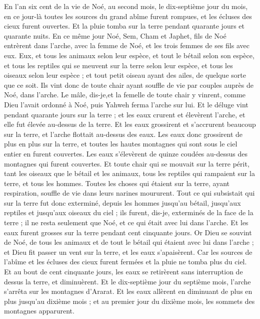 \begin{multicols}{2}
En l'an six cent de la vie de Noé, au second mois, le dix-septième jour du mois, en ce jour-là toutes les sources du grand abîme furent rompues, et les écluses des cieux furent ouvertes.
Et la pluie tomba sur la terre pendant quarante jours et quarante nuits.
En ce même jour Noé, Sem, Cham et Japhet, fils de Noé entrèrent dans l'arche, avec la femme de Noé, et les trois femmes de ses fils avec eux.
Eux, et tous les animaux selon leur espèce, et tout le bétail selon son espèce, et tous les reptiles qui se meuvent sur la terre selon leur espèce, et tous les oiseaux selon leur espèce ; et tout petit oiseau ayant des ailes, de quelque sorte que ce soit.
Ils vint donc de toute chair ayant souffle de vie par couples auprès de Noé, dans l'arche. 
Le mâle, dis-je,et la femelle de toute chair y vinrent, comme Dieu l'avait ordonné à Noé, puis Yahweh ferma l'arche sur lui.
Et le déluge vint pendant quarante jours sur la terre ; et les eaux crurent et élevèrent l'arche, et elle fut élevée au-dessus de la terre.
Et les eaux grossirent et s'accrurent beaucoup sur la terre, et l'arche flottait au-dessus des eaux.
Les eaux donc grossirent de plus en plus sur la terre, et toutes les hautes montagnes qui sont sous le ciel entier en furent couvertes.
Les eaux s'élevèrent de quinze coudées au-dessus des montagnes qui furent couvertes.
Et toute chair qui se mouvait sur la terre périt, tant les oiseaux que le bétail et les animaux, tous les reptiles qui rampaient sur la terre, et tous les hommes.
Toutes les choses qui étaient sur la terre, ayant respiration, souffle de vie dans leurs narines moururent.
Tout ce qui subsistait qui sur la terre fut donc exterminé, depuis les hommes jusqu'au bétail, jusqu'aux reptiles et jusqu'aux oiseaux du ciel ; ils furent, dis-je, exterminés de la face de la terre ; il ne resta seulement que Noé, et ce qui était avec lui dans l'arche.
Et les eaux furent grosses sur la terre pendant cent cinquante jours.
\VerseOne{}Or Dieu se souvint de Noé, de tous les animaux et de tout le bétail qui étaient avec lui dans l'arche ; et Dieu fit passer un vent sur la terre, et les eaux s'apaisèrent.
Car les sources de l'abîme et les écluses des cieux furent fermées et la pluie ne tomba plus du ciel.
Et au bout de cent cinquante jours, les eaux se retirèrent sans interruption de dessus la terre, et diminuèrent.
Et le dix-septième jour du septième mois, l'arche s'arrêta sur les montagnes d'Ararat.
Et les eaux allèrent en diminuant de plus en plus jusqu'au dixième mois ; et au premier jour du dixième mois, les sommets des montagnes apparurent.

\end{multicols}
